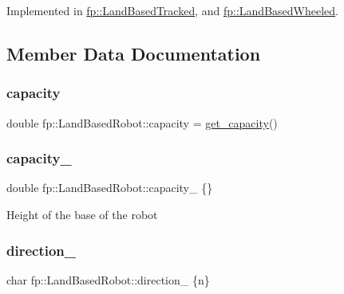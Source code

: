 Implemented in \hyperlink{classfp_1_1_land_based_tracked_a813613a1eaa7a0782ea254a167d97da3}{fp\+::\+Land\+Based\+Tracked}, and \hyperlink{classfp_1_1_land_based_wheeled_a505f5c33f04681aa5c7362531947f4ca}{fp\+::\+Land\+Based\+Wheeled}.



\subsection{Member Data Documentation}
\mbox{\label{classfp_1_1_land_based_robot_af906410bad105b30865b9a02fdd350f9}} 
\subsubsection{\texorpdfstring{capacity}{capacity}}
{\footnotesize\ttfamily double fp\+::\+Land\+Based\+Robot\+::capacity = \hyperlink{classfp_1_1_land_based_robot_a24c0f6d395f3dfd6bdbcf5a2a9801de1}{get\+\_\+capacity}()}

\mbox{\label{classfp_1_1_land_based_robot_a542d90c7c62899e3c3cf28791bbb6c8e}} 
\subsubsection{\texorpdfstring{capacity\+\_\+}{capacity\_}}
{\footnotesize\ttfamily double fp\+::\+Land\+Based\+Robot\+::capacity\+\_\+ \{\}\hspace{0.3cm}{\ttfamily [protected]}}

Height of the base of the robot \mbox{\label{classfp_1_1_land_based_robot_adc8e6123fa8ffe86576e46000b0ae779}} 
\subsubsection{\texorpdfstring{direction\+\_\+}{direction\_}}
{\footnotesize\ttfamily char fp\+::\+Land\+Based\+Robot\+::direction\+\_\+ \{\textquotesingle{}n\textquotesingle{}\}\hspace{0.3cm}{\ttfamily [protected]}}

